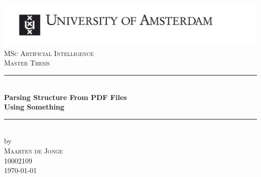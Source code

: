 \begin{titlepage}

\newcommand{\HRule}{\rule{\linewidth}{0.5mm}} %
\center %
 

\includegraphics[width=\linewidth]{uvaENG}\\[2.5cm]
\textsc{\Large MSc Artificial Intelligence}\\[0.2cm]
\textsc{\Large Master Thesis}\\[0.5cm] 


\HRule \\[0.4cm]
{ \huge \bfseries Parsing Structure From PDF Files\\ Using Something}\\[0.4cm] %
\HRule \\[0.5cm]
 

by\\[0.2cm]
\textsc{\Large{Maarten de Jonge}}\\[0.2cm] %
10002109 \\[1cm]



{\Large \today}\\[1cm] %


\end{titlepage}
